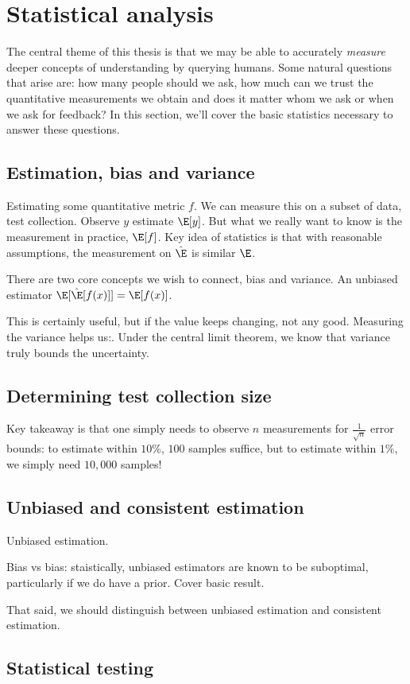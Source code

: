 \section{\label{sec:setup:statistical} Statistical analysis}

The central theme of this thesis is that we may be able to accurately \textit{measure} deeper concepts of understanding by querying humans.
Some natural questions that arise are: how many people should we ask, how much can we trust the quantitative measurements we obtain and does it matter whom we ask or when we ask for feedback?
In this section, we'll cover the basic statistics necessary to answer these questions.

\subsection{Estimation, bias and variance}

Estimating some quantitative metric $f$.
We can measure this on a subset of data, test collection.
Observe $y$ estimate $\E[y]$.
But what we really want to know is the measurement in practice, $\E[f]$.
Key idea of statistics is that with reasonable assumptions, the measurement on $\hat\E$ is similar $\E$.

There are two core concepts we wish to connect, bias and variance.
An unbiased estimator $\E[\hat\E[f(x)]] = \E[f(x)]$.

This is certainly useful, but if the value keeps changing, not any good.
Measuring the variance helps us:.
Under the central limit theorem, we know that variance truly bounds the uncertainty.

\subsection{Determining test collection size}

Key takeaway is that one simply needs to observe $n$ measurements for $\frac{1}{\sqrt{n}}$ error bounds: to estimate within $10\%$, $100$ samples suffice, but to estimate within $1\%$, we simply need $10,000$ samples!

\subsection{Unbiased and consistent estimation}

Unbiased estimation.

Bias vs bias: staistically, unbiased estimators are known to be suboptimal, particularly if we do have a prior.
Cover basic result.

That said, we should distinguish between unbiased estimation and consistent estimation.

\subsection{Statistical testing}


